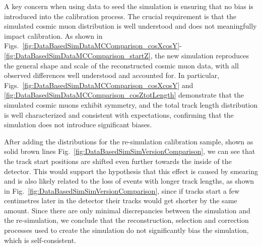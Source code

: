 
A key concern when using data to seed the simulation is ensuring that no bias is introduced into the calibration process. The crucial requirement is that the simulated cosmic muon distribution is well understood and does not meaningfully impact calibration. As shown in Figs.~\ref{fig:DataBasedSimDataMCComparison_cosXcosY}-\ref{fig:DataBasedSimDataMCComparison_startZ}, the new simulation reproduces the general shape and scale of the reconstructed cosmic muon data, with all observed differences well understood and accounted for. In particular, Figs.~\ref{fig:DataBasedSimDataMCComparison_cosXcosY} and \ref{fig:DataBasedSimDataMCComparison_cosZtotLength} demonstrate that the simulated cosmic muons exhibit symmetry, and the total track length distribution is well characterized and consistent with expectations, confirming that the simulation does not introduce significant biases.

After adding the distributions for the re-simulation calibration sample, shown as solid brown lines Fig.~\ref{fig:DataBasedSimSimVersionComparison}, we can see that the track start positions are shifted even further towards the inside of the detector. This would support the hypothesis that this effect is caused by smearing and is also likely related to the loss of events with longer track lengths, as shown in Fig.~\ref{fig:DataBasedSimSimVersionComparison}, since if tracks start a few centimetres later in the detector their tracks would get shorter by the same amount. Since there are only minimal discrepancies between the simulation and the re-simulation, we conclude that the reconstruction, selection and correction processes used to create the simulation do not significantly bias the simulation, which is self-consistent.


